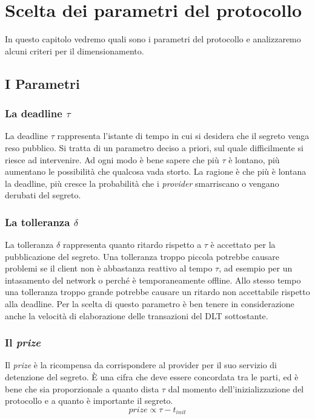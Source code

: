 \chapter{Scelta dei parametri del protocollo}
\label{chap:dimensionamento}

In questo capitolo vedremo quali sono i parametri del protocollo
e analizzaremo alcuni criteri per il dimensionamento.

\section{I Parametri}

\subsection{La deadline $ \tau $}
La deadline $ \tau $ rappresenta l'istante di tempo in cui
si desidera che il segreto venga reso pubblico.
Si tratta di un parametro deciso a priori, sul quale difficilmente si riesce ad
intervenire. Ad ogni modo è bene sapere che più $ \tau $ è lontano, più aumentano
le possibilità che qualcosa vada storto. La ragione è che più è lontana la deadline,
più cresce la probabilità che i \textit{provider} smarriscano o vengano derubati
del segreto.

\subsection{La tolleranza $ \delta $}
La tolleranza $ \delta $ rappresenta quanto ritardo rispetto a $ \tau $ è
accettato per la pubblicazione del segreto. Una tolleranza troppo
piccola potrebbe causare problemi se il client non è abbastanza reattivo
al tempo $ \tau $, ad esempio
per un intasamento del network o
perché è
temporaneamente offline.
Allo stesso tempo una tolleranza
troppo grande potrebbe causare un ritardo non accettabile rispetto alla deadline.
Per la scelta di questo parametro è ben tenere in considerazione anche
la velocità di elaborazione delle transazioni
del DLT sottostante.

\subsection{Il \textit{prize}}
Il \textit{prize} è la ricompensa da corrispondere al provider per il suo servizio
di detenzione del segreto. È una cifra che deve essere concordata tra le parti,
ed è bene che sia proporzionale a quanto dista $ \tau $ dal momento
dell'inizializzazione del protocollo
e a quanto è importante il segreto.
$$ \textit{prize} \propto \tau - t_{init} $$

